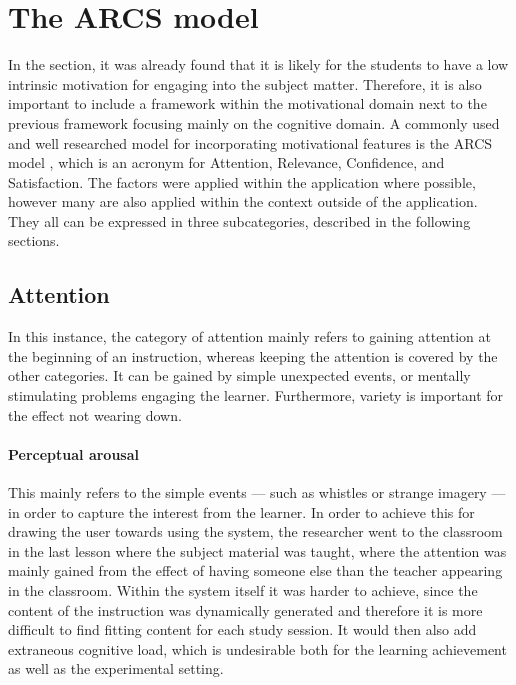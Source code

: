     \section{The ARCS model}

In the  section, it was already found that it is likely for the students to have a low intrinsic motivation for engaging into the subject matter. Therefore, it is also important to include a framework within the motivational domain next to the previous framework focusing mainly on the cognitive domain. A commonly used and well researched model for incorporating motivational features is the ARCS model \cite{arcs}, which is an acronym for Attention, Relevance, Confidence, and Satisfaction. The factors were applied within the application where possible, however many are also applied within the context outside of the application. They all can be expressed in three subcategories, described in the following sections.

        \subsection{Attention}

In this instance, the category of attention mainly refers to gaining attention at the beginning of an instruction, whereas keeping the attention is covered by the other categories. It can be gained by simple unexpected events, or mentally stimulating problems engaging the learner. Furthermore, variety is important for the effect not wearing down.

\paragraph{Perceptual arousal} This mainly refers to the simple events --- such as whistles or strange imagery --- in order to capture the interest from the learner. In order to achieve this for drawing the user towards using the system, the researcher went to the classroom in the last lesson where the subject material was taught, where the attention was mainly gained from the effect of having someone else than the teacher appearing in the classroom. Within the system itself it was harder to achieve, since the content of the instruction was dynamically generated and therefore it is more difficult to find fitting content for each study session. It would then also add extraneous cognitive load, which is undesirable both for the learning achievement as well as the experimental setting.

